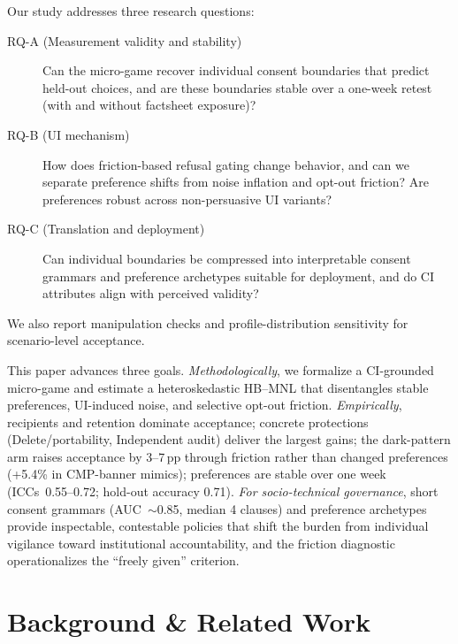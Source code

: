 \documentclass{eusset}
\begin{document}
Our study addresses three research questions:
\begin{description}
\item[RQ-A (Measurement validity and stability)] Can the micro-game recover individual consent boundaries that predict held-out choices, and are these boundaries stable over a one-week retest (with and without factsheet exposure)?
\item[RQ-B (UI mechanism)] How does friction-based refusal gating change behavior, and can we separate preference shifts from noise inflation and opt-out friction? Are preferences robust across non-persuasive UI variants?
\item[RQ-C (Translation and deployment)] Can individual boundaries be compressed into interpretable consent grammars and preference archetypes suitable for deployment, and do CI attributes align with perceived validity?
\end{description}
\noindent We also report manipulation checks and profile-distribution sensitivity for scenario-level acceptance.

This paper advances three goals. \emph{Methodologically}, we formalize a CI-grounded micro-game and estimate a heteroskedastic HB--MNL that disentangles stable preferences, UI-induced noise, and selective opt-out friction. \emph{Empirically}, recipients and retention dominate acceptance; concrete protections (Delete/portability, Independent audit) deliver the largest gains; the dark-pattern arm raises acceptance by 3--7\,pp through friction rather than changed preferences (+5.4\% in CMP-banner mimics); preferences are stable over one week (ICCs~0.55--0.72; hold-out accuracy 0.71). \emph{For socio-technical governance}, short consent grammars (AUC~$\sim$0.85, median 4 clauses) and preference archetypes provide inspectable, contestable policies that shift the burden from individual vigilance toward institutional accountability, and the friction diagnostic operationalizes the ``freely given'' criterion.


\section{Background \& Related Work}
\label{sec:related}
\end{document}
